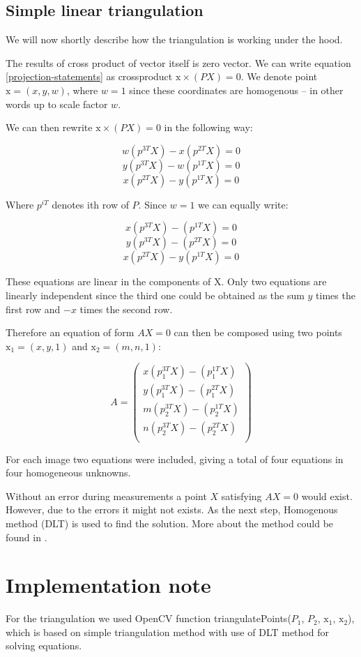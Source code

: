 \subsection{Simple linear triangulation}
We will now shortly describe how the triangulation is working under the hood.

The results of cross product of vector itself is zero vector. We can write
equation \ref{projection-statements} as crossproduct $\mathrm{x} \times (PX) = 0$. We
denote point $\mathrm{x} = (x, y, w)$, where $w = 1$ since these coordinates are
homogenous -- in other words up to scale factor $w$.

We can then rewrite $\mathrm{x} \times (PX) = 0$ in the following way:

$$ w(p^{3T}X) - x(p^{2T}X) = 0 $$
$$ y(p^{3T}X) - w(p^{1T}X) = 0 $$
$$ x(p^{2T}X) - y(p^{1T}X) = 0 $$

Where $p^{iT}$ denotes ith row of $P$. Since $w = 1$ we can equally write:

$$ x(p^{3T}X) - (p^{1T}X) = 0 $$
$$ y(p^{3T}X) - (p^{2T}X) = 0 $$
$$ x(p^{2T}X) - y(p^{1T}X) = 0 $$

These equations are linear in the components of X. Only two equations are
linearly independent since the third one could be obtained as the sum $y$
times the first row and $-x$ times the second row.

Therefore an equation of form $AX = 0$ can then be composed using two points $\mathrm{x_1} = (x, y, 1)$ and $\mathrm{x_2} = (m, n, 1)$:

\[
A = \begin{pmatrix}
x(p_1^{3T}X) - (p_1^{1T}X) \\
y(p_1^{3T}X) - (p_1^{2T}X) \\
m(p_2^{3T}X) - (p_2^{1T}X) \\
n(p_2^{3T}X) - (p_2^{2T}X) \\
\end{pmatrix}
\]

For each image two equations were included, giving a total of four equations in
four homogeneous unknowns.

Without an error during measurements a point $X$ satisfying $AX = 0$ would
exist. However, due to the errors it might not exists. As the next step, Homogenous
method (DLT) is used to find the solution. More about the method could be found
in \citet*{multiple-view-geometry}.

\section{Implementation note}
For the triangulation we used OpenCV function triangulatePoints($P_1$, $P_2$,
$\mathrm{x_1}$, $\mathrm{x_2}$), which is based on simple triangulation method with use of DLT
method for solving equations.
